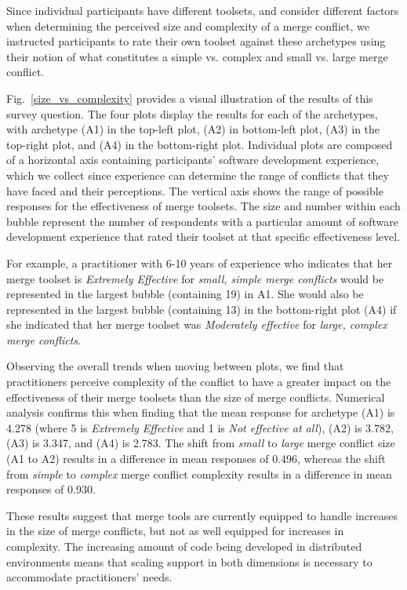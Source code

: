 Since individual participants have different toolsets, and consider different factors when determining the perceived size and complexity of a merge conflict, we instructed participants to rate their own toolset against these archetypes using their notion of what constitutes a simple vs. complex and small vs. large merge conflict.

Fig.~\ref{size_vs_complexity} provides a visual illustration of the results of this survey question.
The four plots display the results for each of the archetypes, with archetype (A1) in the top-left plot, (A2) in bottom-left plot, (A3) in the top-right plot, and (A4) in the bottom-right plot.
Individual plots are composed of a horizontal axis containing participants' software development experience, which we collect since experience can determine the range of conflicts that they have faced and their perceptions.
The vertical axis shows the range of possible responses for the effectiveness of merge toolsets.
The size and number within each bubble represent the number of respondents with a particular amount of software development experience that rated their toolset at that specific effectiveness level.

For example, a practitioner with 6-10 years of experience who indicates that her merge toolset is \textit{Extremely Effective} for \textit{small, simple merge conflicts} would be represented in the largest bubble (containing 19) in A1. %
She would also be represented in the largest bubble (containing 13) in the bottom-right plot (A4) if she indicated that her merge toolset was \textit{Moderately effective} for \textit{large, complex merge conflicts}.

Observing the overall trends when moving between plots, we find that practitioners perceive complexity of the conflict to have a greater impact on the effectiveness of their merge toolsets than the size of merge conflicts.
Numerical analysis confirms this when finding that the mean response for archetype (A1) is 4.278 (where 5 is \textit{Extremely Effective} and 1 is \textit{Not effective at all}), (A2) is 3.782, (A3) is 3.347, and (A4) is 2.783.
The shift from \textit{small} to \textit{large} merge conflict size (A1 to A2) results in a difference in mean responses of 0.496, whereas the shift from \textit{simple} to \textit{complex} merge conflict complexity results in a difference in mean responses of 0.930.

These results suggest that merge tools are currently equipped to handle increases in the size of merge conflicts, but not as well equipped for increases in complexity.
The increasing amount of code being developed in distributed environments means that scaling support in both dimensions is necessary to accommodate practitioners' needs.